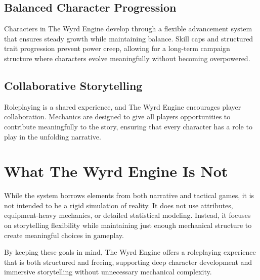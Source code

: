 \subsection{Balanced Character Progression}
Characters in The Wyrd Engine develop through a flexible advancement system that ensures steady growth while maintaining balance. Skill caps and structured trait progression prevent power creep, allowing for a long-term campaign structure where characters evolve meaningfully without becoming overpowered.

\subsection{Collaborative Storytelling}
Roleplaying is a shared experience, and The Wyrd Engine encourages player collaboration. Mechanics are designed to give all players opportunities to contribute meaningfully to the story, ensuring that every character has a role to play in the unfolding narrative.

\section{What The Wyrd Engine Is Not}
While the system borrows elements from both narrative and tactical games, it is not intended to be a rigid simulation of reality. It does not use attributes, equipment-heavy mechanics, or detailed statistical modeling. Instead, it focuses on storytelling flexibility while maintaining just enough mechanical structure to create meaningful choices in gameplay.

By keeping these goals in mind, The Wyrd Engine offers a roleplaying experience that is both structured and freeing, supporting deep character development and immersive storytelling without unnecessary mechanical complexity.
